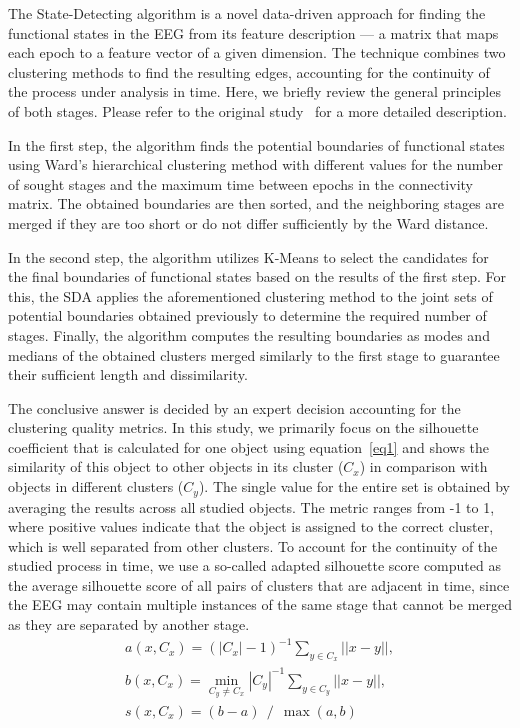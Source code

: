 \documentclass[journal,twoside,web]{ieeecolor2}
\begin{document}
The State-Detecting algorithm is a novel data-driven approach for finding the functional states in the EEG from its feature description --- a matrix that maps each epoch to a feature vector of a given dimension. The technique combines two clustering methods to find the resulting edges, accounting for the continuity of the process under analysis in time. Here, we briefly review the general principles of both stages. Please refer to the original study~\cite{SDA} for a more detailed description.

In the first step, the algorithm finds the potential boundaries of functional states using Ward's hierarchical clustering method with different values for the number of sought stages and the maximum time between epochs in the connectivity matrix. The obtained boundaries are then sorted, and the neighboring stages are merged if they are too short or do not differ sufficiently by the Ward distance.

In the second step, the algorithm utilizes K-Means to select the candidates for the final boundaries of functional states based on the results of the first step. For this, the SDA applies the aforementioned clustering method to the joint sets of potential boundaries obtained previously to determine the required number of stages. Finally, the algorithm computes the resulting boundaries as modes and medians of the obtained clusters merged similarly to the first stage to guarantee their sufficient length and dissimilarity.

The conclusive answer is decided by an expert decision accounting for the clustering quality metrics. In this study, we primarily focus on the silhouette coefficient that is calculated for one object using equation~\eqref{eq1} and shows the similarity of this object to other objects in its cluster ($C_x$) in comparison with objects in different clusters ($C_y$). The single value for the entire set is obtained by averaging the results across all studied objects. The metric ranges from -1 to 1, where positive values indicate that the object is assigned to the correct cluster, which is well separated from other clusters. To account for the continuity of the studied process in time, we use a so-called adapted silhouette score computed as the average silhouette score of all pairs of clusters that are adjacent in time, since the EEG may contain multiple instances of the same stage that cannot be merged as they are separated by another stage.
\begin{align}
    a(x, C_x) = {(|C_x| - 1)} ^ {-1} \sum_{y \in C_x} ||x - y||, \nonumber\\
    b(x, C_x) = \min_{C_y \ne C_x} {|C_y|} ^ {-1} \sum_{y \in C_y} ||x - y||, \nonumber\\
    s(x, C_x) = (b - a)~~/~~\max(a, b) \label{eq1}
\end{align}
\end{document}
